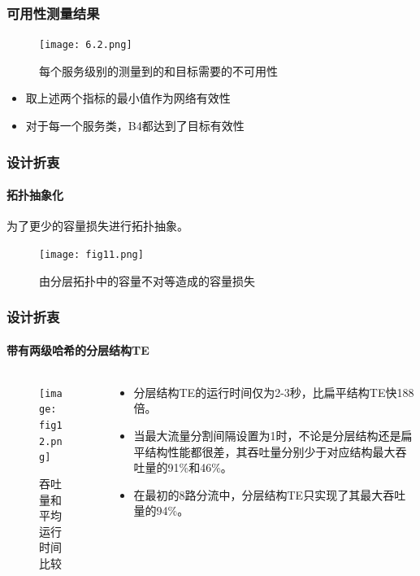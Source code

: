 \begin{frame}
    \frametitle{可用性测量结果}
    \begin{figure}
        \centering
        \texttt{[image: 6.2.png]}
        \caption{每个服务级别的测量到的和目标需要的不可用性} %
    \end{figure}

    \begin{itemize}
        \item 取上述两个指标的最小值作为网络有效性
        \item 对于每一个服务类，B4都达到了目标有效性
    \end{itemize}
\end{frame}


\begin{frame}
    \frametitle{设计折衷}
    \framesubtitle{拓扑抽象化}
    为了更少的容量损失进行拓扑抽象。
    \begin{figure}[h]%
        \centering  %
        \texttt{[image: fig11.png]}
        \caption{由分层拓扑中的容量不对等造成的容量损失}  %
    \end{figure}
\end{frame}

\begin{frame}
    \frametitle{设计折衷}
    \framesubtitle{带有两级哈希的分层结构TE}
    \begin{columns}
        \begin{column}{0.4\textwidth}
            \begin{figure}[h]%
                \centering  %
                \texttt{[image: fig12.png]}
                \caption{吞吐量和平均运行时间比较}  %
            \end{figure}
        \end{column}
        \begin{column}{0.6\textwidth}
            \begin{itemize}
                \item 分层结构TE的运行时间仅为2-3秒，比扁平结构TE快188倍。
                \item 当最大流量分割间隔设置为1时，不论是分层结构还是扁平结构性能都很差，其吞吐量分别少于对应结构最大吞吐量的91\%和46\%。
                \item 在最初的8路分流中，分层结构TE只实现了其最大吞吐量的94\%。
            \end{itemize}
        \end{column}
    \end{columns}
\end{frame}

